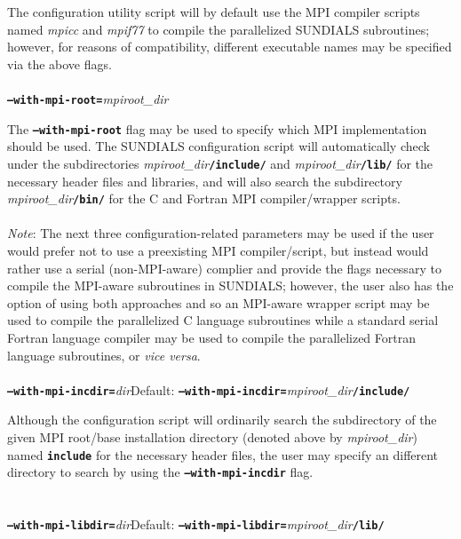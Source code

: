 \documentclass[10pt]{report}
\begin{document}
The configuration utility script will by default use the \small MPI \normalsize compiler scripts named \textit{mpicc} and \textit{mpif77} to compile the parallelized \small SUNDIALS \normalsize subroutines; however, for reasons of compatibility, different executable names may be specified via the above flags.
\\
\\
\texttt{\textbf{--with-mpi-root=}}\textit{mpiroot\_dir}\vspace{0.05in}

The \texttt{\textbf{--with-mpi-root}} flag may be used to specify which \small MPI \normalsize implementation should be used.  The \small SUNDIALS \normalsize configuration script will automatically check under the subdirectories \textit{mpiroot\_dir}\texttt{\textbf{/include/}} and \textit{mpiroot\_dir}\texttt{\textbf{/lib/}} for the necessary header files and libraries, and will also search the subdirectory \textit{mpiroot\_dir}\texttt{\textbf{/bin/}} for the C and Fortran \small MPI \normalsize compiler/wrapper scripts.
\\
\\
\textit{Note}: The next three configuration-related parameters may be used if the user would prefer not to use a preexisting \small MPI \normalsize compiler/script, but instead would rather use a serial (non-\small MPI\normalsize-aware) complier and provide the flags necessary to compile the \small MPI\normalsize-aware subroutines in \small SUNDIALS\normalsize ; however, the user also has the option of using both approaches and so an \small MPI\normalsize -aware wrapper script may be used to compile the parallelized C language subroutines while a standard serial Fortran language compiler may be used to compile the parallelized Fortran language subroutines, or \textit{vice versa}.
\\
\\
\texttt{\textbf{--with-mpi-incdir=}}\textit{dir}\hspace{0.5in}Default: \texttt{\textbf{--with-mpi-incdir=}}\textit{mpiroot\_dir}\texttt{\textbf{/include/}}\vspace{0.05in}

Although the configuration script will ordinarily search the subdirectory of the given \small MPI \normalsize root/base installation directory (denoted above by \textit{mpiroot\_dir}) named \texttt{\textbf{include}} for the necessary header files, the user may specify an different directory to search by using the \texttt{\textbf{--with-mpi-incdir}} flag.
\\
\\
\\
\texttt{\textbf{--with-mpi-libdir=}}\textit{dir}\hspace{0.5in}Default: \texttt{\textbf{--with-mpi-libdir=}}\textit{mpiroot\_dir}\texttt{\textbf{/lib/}}\vspace{0.05in}
\end{document}
